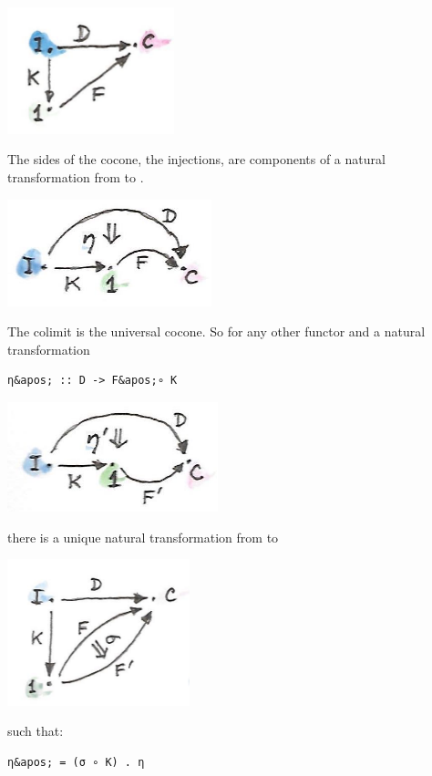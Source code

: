\includegraphics[width=1.90625in]{images/kan81.jpg}

The sides of the cocone, the injections, are components of a natural
transformation  from  to .

\includegraphics[width=2.33333in]{images/kan10a.jpg}

The colimit is the universal cocone. So for any other functor
 and a natural transformation

\begin{verbatim}
η&apos; :: D -> F&apos;∘ K
\end{verbatim}

\includegraphics[width=2.40625in]{images/kan10b.jpg}

there is a unique natural transformation  from  to

\includegraphics[width=2.08333in]{images/kan14.jpg}

such that:

\begin{verbatim}
η&apos; = (σ ∘ K) . η
\end{verbatim}

